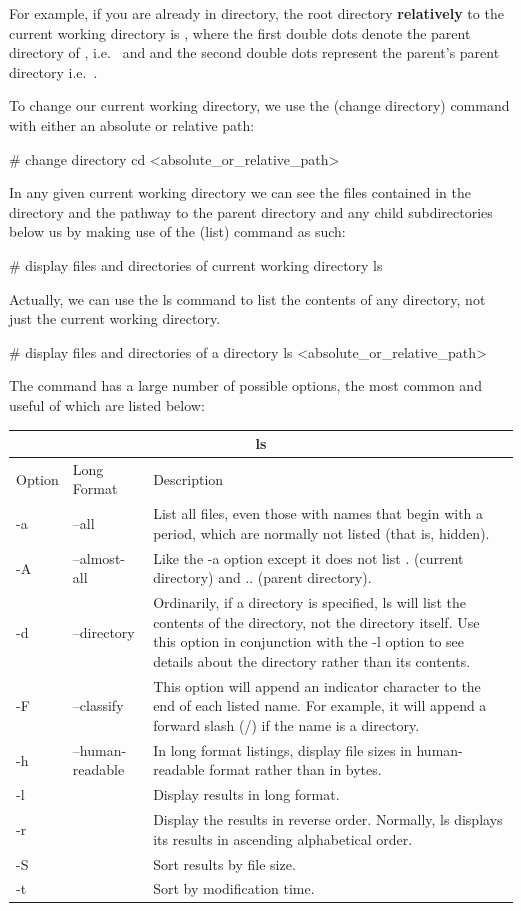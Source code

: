 \be
For example, if you are already in  directory, the root directory \textbf{relatively} to the current
working directory  is , where the first double dots denote the parent directory of
, i.e.\  and and the second double dots represent the parent's parent directory i.e.\
\code{/}.
\ee

To change our current working directory, we use the  (change directory) command with either an absolute or
relative path:
\begin{bash}
# change directory
cd <absolute_or_relative_path>
\end{bash}

In any given current working directory we can see the files contained in the directory and the pathway
to the parent directory and any child subdirectories below us by making use of the \code{ls} (list) command as such:
\begin{bash}
# display files and directories of current working directory
ls
\end{bash}

Actually, we can use the ls command to list the contents of any directory, not just the current working directory.
\begin{bash}
# display files and directories of a directory
ls <absolute_or_relative_path>
\end{bash}

The  command has a large number of possible options, the most common and useful of which are listed below:

\begin{tabular}{ |p{1cm}|p{3cm}||p{10.6cm}| }
\hline
\multicolumn{3}{|c|}{ls} \\
\hline
Option& Long Format& Description\\
\hline
-a & --all & List all files, even those with names that begin with a period, which are normally not listed (that is,
hidden).\\
-A & --almost-all & Like the -a option except it does not list . (current directory) and .. (parent directory).\\
-d & --directory & Ordinarily, if a directory is specified, ls will list the contents of the directory, not the
directory itself. Use this option in conjunction with the -l option to see details about the directory rather than its
contents.\\
-F & --classify & This option will append an indicator character to the end of each listed name. For example, it will
append a forward slash (/) if the name is a directory.\\
-h & --human-readable & In long format listings, display file sizes in human-readable format rather than in bytes.\\
-l  & & Display results in long format.\\
-r & & Display the results in reverse order. Normally, ls displays its results in ascending alphabetical order.\\
-S  & & Sort results by file size.\\
-t  & & Sort by modification time.\\
\hline
\end{tabular}

